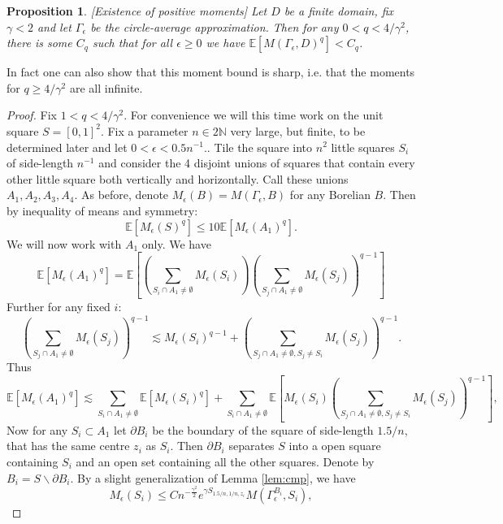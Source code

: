 \documentclass[11pt]{amsart}
\newtheorem{prop}[thm]{Proposition}
\newcommand{\N}{\mathbb N}
\newcommand{\E}{\mathbb E}
\renewcommand{\1}{\mathbf 1}
\newcommand{\eps}{\epsilon}
\begin{document}
\begin{prop}\label{prop:posm1}[Existence of positive moments]
Let $D$ be a finite domain, fix $\gamma < 2$ and let $\Gamma_\eps$ be the circle-average approximation. Then for any $0 < q < 4/\gamma^2$, there is some $C_q$ such that for all $\eps \geq 0$ we have $\E \left[M(\Gamma_\eps,D)^q\right] < C_q$.
\end{prop}

In fact one can also show that this moment bound is sharp, i.e. that the moments for $q \geq 4/\gamma^2$ are all infinite.

\begin{proof} Fix $1 < q < 4/\gamma^2$. For convenience we will this time work on the unit square $S = [0,1]^2$.  
Fix a parameter $n \in 2\N$ very large, but finite, to be determined later and let $0 < \eps < 0.5n^{-1}$.. Tile the square into $n^2$ little squares $S_i$ of side-length $n^{-1}$ and consider the 4 disjoint
unions of squares that contain every other little square both vertically and horizontally. Call these unions $A_1,
A_2, A_3, A_4$. As before, denote $M_\eps(B) = M(\Gamma_\eps, B)$ for any Borelian $B$. Then by inequality of means and symmetry:
$$ \E \left[M_\eps(S)^q\right] \leq 10\E \left[M_\eps(A_1)^q\right].$$
We will now work with $A_1$ only. We have
\[ \E \left[M_\eps(A_1)^q\right] =\E \left[\left(\sum_{S_i \cap A_1
   \neq \emptyset}M_\eps(S_i)\right) \left( \sum_{S_j \cap A_1 \neq \emptyset} M_\eps
   (S_j) \right)^{q-1}\right] \]
Further for any fixed $i$:
\[ \left( \sum_{S_j \cap A_1 \neq \emptyset} M_\eps (S_j) \right)^{q-1}
   \lesssim M_\eps(S_i)^{q-1} + \left(\sum_{S_j \cap A_1 \neq \emptyset, S_j \neq S_i} M_\eps (S_j)\right)^{q-1}. \]
Thus
\[ \E \left[M_\eps(A_1)^{q}\right] \lesssim \sum_{S_i \cap A_1 \neq
   \emptyset} \E \left[M_\eps (S_i)^{q}\right] + \sum_{S_i \cap A_1 \neq
   \emptyset} \E \left[M_\eps (S_i) \left(\sum_{S_j \cap A_1 \neq \emptyset, S_j \neq S_i} M_\eps (S_j)\right)^{q-1}\right], \]
Now for any $S_i \subset A_1$ let $\partial B_i$ be the boundary of the square of side-length $1.5/n$, that has the same centre $z_i$ as $S_i$. Then $\partial B_i$ separates $S$ into a open square containing $S_i$ and an open set containing all the other squares. Denote by $B_i = S \backslash \partial B_i$. By a slight generalization of Lemma \ref{lem:cmp}, we have
   $$M_\eps(S_i) \leq Cn^{-\frac{\gamma^2}{2}}e^{\gamma S_{1.5/n,1/n,z_i}} M(\Gamma_\eps^{B_i},S_i),$$

\end{proof}
\end{document}
